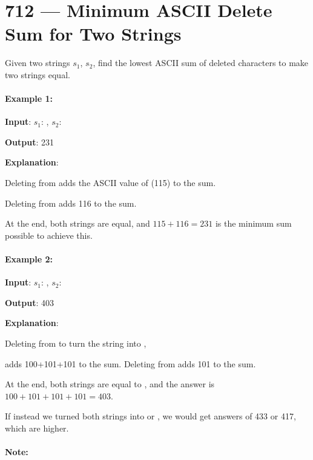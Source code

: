 \section{712 --- Minimum ASCII Delete Sum for Two Strings}
Given two strings $s_1$, $s_2$, find the lowest ASCII sum of deleted characters to make two strings equal.

\paragraph{Example 1:}
\begin{flushleft}


\textbf{Input}: $s_1$: , $s_2$: 

\textbf{Output}: 231

\textbf{Explanation}: 

Deleting  from  adds the ASCII value of  (115) to the sum.

Deleting  from  adds 116 to the sum.

At the end, both strings are equal, and $115 + 116 = 231$ is the minimum sum possible to achieve this.
\end{flushleft}

\paragraph{Example 2:}

\begin{flushleft}
\textbf{Input}: $s_1$: , $s_2$: 

\textbf{Output}: 403

\textbf{Explanation}: 

Deleting  from  to turn the string into ,

adds 100\fcj{[d]}+101\fcj{[e]}+101\fcj{[e]} to the sum.  Deleting  from  adds 101\fcj{[e]} to the sum.

At the end, both strings are equal to , and the answer is $100+101+101+101 = 403$.

If instead we turned both strings into  or , we would get answers of 433 or 417, which are higher.

\end{flushleft}

\paragraph{Note:}

